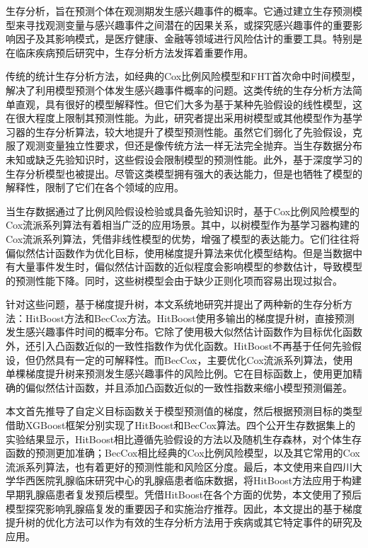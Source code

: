 	
\begin{chineseabstract}
    生存分析，旨在预测个体在观测期发生感兴趣事件的概率。它通过建立生存预测模型来寻找观测变量与感兴趣事件之间潜在的因果关系，或探究感兴趣事件的重要影响因子及其影响模式，是医疗健康、金融等领域进行风险估计的重要工具。特别是在临床疾病预后研究中，生存分析方法发挥着重要作用。

    传统的统计生存分析方法，如经典的Cox比例风险模型和FHT首次命中时间模型，解决了利用模型预测个体发生感兴趣事件概率的问题。这类传统的生存分析方法简单直观，具有很好的模型解释性。但它们大多为基于某种先验假设的线性模型，这在很大程度上限制其预测性能。为此，研究者提出采用树模型或其他模型作为基学习器的生存分析算法，较大地提升了模型预测性能。虽然它们弱化了先验假设，克服了观测变量独立性要求，但还是像传统方法一样无法完全抛弃。当生存数据分布未知或缺乏先验知识时，这些假设会限制模型的预测性能。此外，基于深度学习的生存分析模型也被提出。尽管这类模型拥有强大的表达能力，但是也牺牲了模型的解释性，限制了它们在各个领域的应用。

    当生存数据通过了比例风险假设检验或具备先验知识时，基于Cox比例风险模型的Cox流派系列算法有着相当广泛的应用场景。其中，以树模型作为基学习器构建的Cox流派系列算法，凭借非线性模型的优势，增强了模型的表达能力。它们往往将偏似然估计函数作为优化目标，使用梯度提升算法来优化模型结构。但是当数据中有大量事件发生时，偏似然估计函数的近似程度会影响模型的参数估计，导致模型的预测性能下降。同时，这些树模型会由于缺少正则化项而容易出现过拟合。

    针对这些问题，基于梯度提升树，本文系统地研究并提出了两种新的生存分析方法：HitBoost方法和BecCox方法。HitBoost使用多输出的梯度提升树，直接预测发生感兴趣事件时间的概率分布。它除了使用极大似然估计函数作为目标优化函数外，还引入凸函数近似的一致性指数作为优化函数。HitBoost不再基于任何先验假设，但仍然具有一定的可解释性。而BecCox，主要优化Cox流派系列算法，使用单棵梯度提升树来预测发生感兴趣事件的风险比例。它在目标函数上，使用更加精确的偏似然估计函数，并且添加凸函数近似的一致性指数来缩小模型预测偏差。

    本文首先推导了自定义目标函数关于模型预测值的梯度，然后根据预测目标的类型借助XGBoost框架分别实现了HitBoost和BecCox算法。四个公开生存数据集上的实验结果显示，HitBoost相比遵循先验假设的方法以及随机生存森林，对个体生存函数的预测更加准确；BecCox相比经典的Cox比例风险模型，以及其它常用的Cox流派系列算法，也有着更好的预测性能和风险区分度。最后，本文使用来自四川大学华西医院乳腺临床研究中心的乳腺癌患者临床数据，将HitBoost方法应用于构建早期乳腺癌患者复发预后模型。凭借HitBoost在各个方面的优势，本文使用了预后模型探究影响乳腺癌复发的重要因子和实施治疗推荐。因此，本文提出的基于梯度提升树的优化方法可以作为有效的生存分析方法用于疾病或其它特定事件的研究及应用。

\end{chineseabstract}

